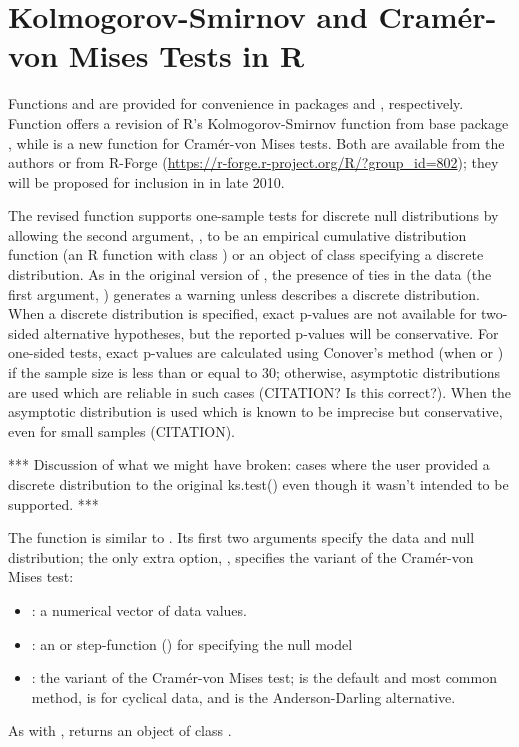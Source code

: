 \section{Kolmogorov-Smirnov and Cram\'{e}r-von Mises Tests in R}

Functions  and  are provided for
convenience in packages  and , respectively.
Function  offers a revision of
R's Kolmogorov-Smirnov function  from base
package , while  is a new
function for Cram\'{e}r-von Mises tests.
Both are available from the authors
or from R-Forge (\url{https://r-forge.r-project.org/R/?group_id=802});
they will be proposed for inclusion in  in late 2010.

The revised  function supports one-sample tests for discrete
null distributions by allowing the second argument, , to be
an empirical cumulative distribution function (an R function
with class ) or an object of class  specifying
a discrete distribution.  As in the original version of ,
the presence of ties in the data (the first argument, ) generates a
warning unless  describes a discrete distribution.  When a discrete
distribution is specified, exact p-values are not available for 
two-sided alternative hypotheses, but the reported p-values will be
conservative.  For one-sided tests,
exact p-values are calculated using Conover's
method (when  or )
if the sample size is less than or equal to 30; otherwise, asymptotic distributions
are used which are reliable in such cases (CITATION? Is this correct?).
When  the asymptotic distribution is used which is known
to be imprecise but conservative, even for small samples (CITATION).

*** Discussion of what we might have broken: cases where the user
provided a discrete distribution to the original ks.test() even though
it wasn't intended to be supported. ***

The function  is similar to .  Its first two
arguments specify the data and null distribution; the only extra option,
, specifies the variant of the Cram\'{e}r-von Mises test:
\begin{itemize}
\item {}: a numerical vector of data values.
\item {}: an  or step-function () for specifying
the null model
\item {}: the variant of the Cram\'{e}r-von Mises test; 
is the default and most common method,  is for cyclical data,
and  is the Anderson-Darling alternative.
\end{itemize}
As with ,  returns an object of class 
.

